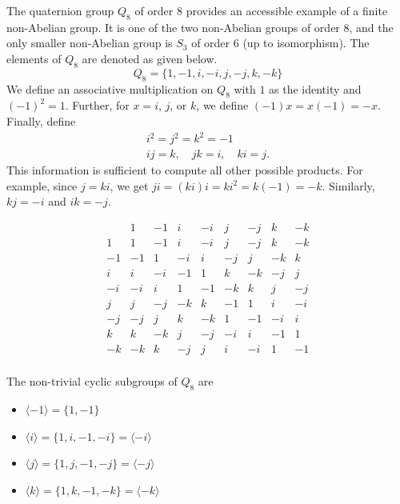 \documentclass[svgnames]{article}
\theoremstyle{definition}
\theoremstyle{remark}
\newcommand{\newterm}[1]{{\color{alertcolor} #1}}
\begin{document}
\begin{appendices}
The \newterm{quaternion group} $Q_8$ of order $8$ provides an accessible example of a finite non-Abelian group. It is one of the two non-Abelian groups of order $8$, and the only smaller non-Abelian group is $S_3$ of order $6$ (up to isomorphism). The elements of $Q_8$ are denoted as given below.
\begin{equation*}
Q_8 = \{1, -1, i, -i, j, -j, k, -k\}
\end{equation*}
We define an associative multiplication on $Q_8$ with $1$ as the identity and $(-1)^2 = 1$. Further, for $x = i$, $j$, or $k$, we define $(-1)x = x(-1) = -x$. Finally, define
\begin{gather*}
i^2 = j^2 = k^2 = -1\\
ij = k, \quad jk = i, \quad ki = j.
\end{gather*}
This information is sufficient to compute all other possible products. For example, since $j = ki$, we get $ji = (ki)i = ki^2 = k(-1) = -k$. Similarly, $kj = -i$ and $ik = -j$.

\begin{equation*}
\begin{array}{r|cccccccc}
	&	1	&	-1	&	i	&	-i	&	j	&	-j	&	k	&	-k\\
\hline
1	&	1	&	-1	&	i	&	-i	&	j	&	-j	&	k	&	-k\\
-1	&	-1	&	1	&	-i	&	i	&	-j	&	j	&	-k	&	k\\
i	&	i	&	-i	&	-1	&	1	&	k	&	-k	&	-j	&	j\\
-i	&	-i	&	i	&	1	&	-1	&	-k	&	k	&	j	&	-j\\
j	&	j	&	-j	&	-k	&	k	&	-1	&	1	&	i	&	-i\\
-j	&	-j	&	j	&	k	&	-k	&	1	&	-1	&	-i	&	i\\
k	&	k	&	-k	&	j	&	-j	&	-i	&	i	&	-1	&	1\\
-k	&	-k	&	k	&	-j	&	j	&	i	&	-i	&	1	&	-1\\
\end{array}
\end{equation*}

The non-trivial cyclic subgroups of $Q_8$ are
\begin{itemize}
\item $\langle -1 \rangle = \{1, -1\}$
\item $\langle i \rangle = \{1, i, -1, -i\} = \langle -i \rangle$
\item $\langle j \rangle = \{1, j, -1, -j\} = \langle -j \rangle$
\item $\langle k \rangle = \{1, k, -1, -k\} = \langle -k \rangle$
\end{itemize}


\end{appendices}
\end{document}
